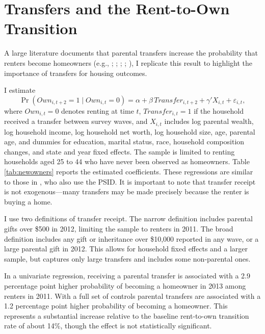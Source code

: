 \documentclass[12pt]{article}
\begin{document}
\newpage
\begingroup\singlespacing


\endgroup
\newpage


\appendix

\setcounter{figure}{0}
\renewcommand{\thefigure}{A\arabic{figure}}
\setcounter{table}{0}
\renewcommand{\thetable}{A\arabic{table}}

\section{Transfers and the Rent-to-Own Transition}\label{app:rent_to_own}
A large literature documents that parental transfers increase the probability that renters become homeowners (e.g., \citealp{wold2024housing}; \citealp{Blickle2019}; \citealp{benetton2022dynastic}; \citealp{Guiso2002}; \citealp{Engelhardt1998}), I replicate this result to highlight the importance of transfers for housing outcomes. 

I estimate
\begin{equation}	\label{eq:transferrent}
	\Pr\left(Own_{i,t+2}=1 \mid Own_{i,t}=0\right)
	= \alpha + \beta\,Transfer_{i,t+2}
	  + \gamma' X_{i,t} + \varepsilon_{i,t},
\end{equation}
where \(Own_{i,t}=0\) denotes renting at time \(t\), \(Transfer_{i,t}=1\) if the household received a transfer between survey waves, and \(X_{i,t}\) includes log parental wealth, log household income, log household net worth, log household size, age, parental age, and dummies for  education, marital status, race, household composition changes, and state and year fixed effects. The sample is limited to renting households aged 25 to 44 who have never been observed as homeowners. Table \ref{tab:newowners} reports the estimated coefficients. These regressions are similar to those in \cite{Lee2018}, who also use the PSID.  It is important to note that transfer receipt is not exogenous---many transfers may be made precisely because the renter is buying a home.

I use two definitions of transfer receipt. The narrow definition includes parental gifts over \$500 in 2012, limiting the sample to renters in 2011. The broad definition includes any gift or inheritance over \$10,000 reported in any wave, or a large parental gift in 2012. This allows for household fixed effects and a larger sample, but captures only large transfers and includes some non-parental ones.

In a univariate regression, receiving a parental transfer is associated with a 2.9 percentage point higher probability of becoming a homeowner in 2013 among renters in 2011. With a full set of controls parental transfers are associated with a 1.2 percentage point higher probability of becoming a homeowner. This represents a substantial increase relative to the baseline rent-to-own transition rate of about 14\%, though the effect is not statistically significant. 
\end{document}
